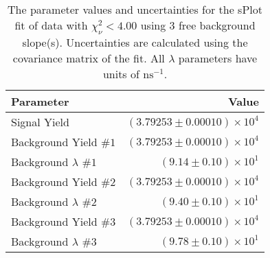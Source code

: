 
\begin{table}
    \begin{center}
        \begin{tabular}{lr}\toprule
            Parameter & Value \\\midrule
            Signal Yield & $(3.79253 \pm 0.00010) \times 10^{4}$ \\
            Background Yield $\#1$ & $(3.79253 \pm 0.00010) \times 10^{4}$ \\
            Background $\lambda$ $\#1$ & $(9.14 \pm 0.10) \times 10^{1}$ \\
            Background Yield $\#2$ & $(3.79253 \pm 0.00010) \times 10^{4}$ \\
            Background $\lambda$ $\#2$ & $(9.40 \pm 0.10) \times 10^{1}$ \\
            Background Yield $\#3$ & $(3.79253 \pm 0.00010) \times 10^{4}$ \\
            Background $\lambda$ $\#3$ & $(9.78 \pm 0.10) \times 10^{1}$ \\\bottomrule
        \end{tabular}
        \caption{The parameter values and uncertainties for the sPlot fit of data with $\chi^2_\nu < 4.00$ using 3 free background slope(s). Uncertainties are calculated using the covariance matrix of the fit. All $\lambda$ parameters have units of $\si{\nano\second}^{-1}$.}
    \end{center}
\end{table}
